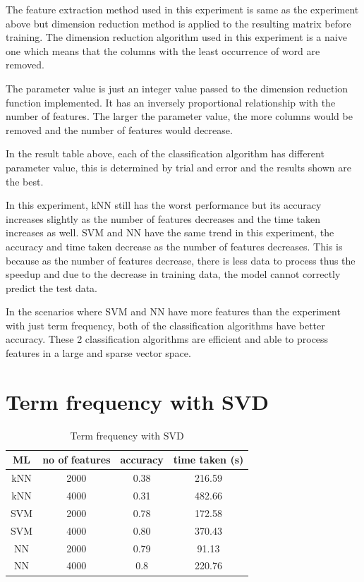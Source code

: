 The feature extraction method used in this experiment is same as the experiment above but dimension reduction method is applied to the resulting matrix before training. The dimension reduction algorithm used in this experiment is a naive one which means that the columns with the least occurrence of word are removed.

The parameter value is just an integer value passed to the dimension reduction function implemented. It has an inversely proportional relationship with the number of features. The larger the parameter value, the more columns would be removed and the number of features would decrease.

In the result table above, each of the classification algorithm has different parameter value, this is determined by trial and error and the results shown are the best.

In this experiment, kNN still has the worst performance but its accuracy increases slightly as the number of features decreases and the time taken increases as well. SVM and NN have the same trend in this experiment, the accuracy and time taken decrease as the number of features decreases. This is because as the number of features decrease, there is less data to process thus the speedup and due to the decrease in training data, the model cannot correctly predict the test data.

In the scenarios where SVM and NN have more features than the experiment with just term frequency, both of the classification algorithms have better accuracy. These 2 classification algorithms are efficient and able to process features in a large and sparse vector space.



\section{Term frequency with SVD}

\begin{table} [ht]
	\centering
	\begin{tabular}{|| c | c | c | c||}
		\hline
		ML & no of features & accuracy & time taken (s) \\ [0.5ex]
		\hline\hline
		kNN & 2000 & 0.38 & 216.59 \\ 
		\hline
		kNN & 4000 & 0.31 & 482.66 \\
		\hline\hline
		SVM & 2000 & 0.78 & 172.58 \\
		\hline
		SVM & 4000 & 0.80 & 370.43 \\
		\hline\hline
		NN & 2000 & 0.79 & 91.13 \\
		\hline
		NN & 4000 & 0.8 & 220.76 \\
		\hline\hline
	\end{tabular}
\caption{Term frequency with SVD}
\label{tbl:termFrequencySvd}
\end{table}

